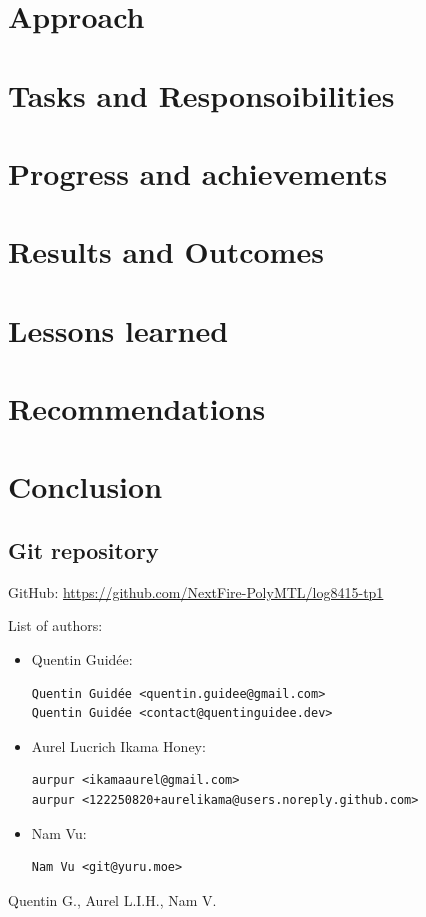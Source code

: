 \documentclass[letterpaper,headings=standardclasses,parskip=half]{scrartcl}
\newcommand{\todo}{{\color{red}{TODO}}}
\begin{document}
\todo

\section{Approach}

\todo

\section{Tasks and Responsoibilities}

\todo

\section{Progress and achievements}

\todo

\section{Results and Outcomes}

\todo

\section{Lessons learned}

\todo

\section{Recommendations}

\todo

\section{Conclusion}

\todo


\subsection*{Git repository}

GitHub: \url{https://github.com/NextFire-PolyMTL/log8415-tp1}

List of authors:

\begin{itemize}
    \item Quentin Guidée:
\begin{lstlisting}
Quentin Guidée <quentin.guidee@gmail.com>
Quentin Guidée <contact@quentinguidee.dev>
\end{lstlisting}
    \item Aurel Lucrich Ikama Honey:
\begin{lstlisting}
aurpur <ikamaaurel@gmail.com>
aurpur <122250820+aurelikama@users.noreply.github.com>
\end{lstlisting}
    \item Nam Vu:
\begin{lstlisting}
Nam Vu <git@yuru.moe>
\end{lstlisting}
\end{itemize}


Quentin G., Aurel L.I.H., Nam V.

\end{document}
